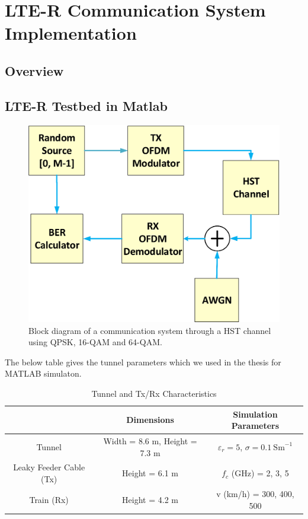\chapter{LTE-R Communication System Implementation}
\label{chapter5}

\section{Overview}

\section{LTE-R Testbed in Matlab}

\begin{figure}[!ht]
\label{finalblock}
\centering
\includegraphics[width=\linewidth,keepaspectratio]{images/Gill/lte_figs/finalblock.eps} 
\caption{Block diagram of a communication system through a HST channel using QPSK, 16-QAM and 64-QAM.}
\end{figure}
The below table gives the tunnel parameters which we used in the thesis for MATLAB simulaton.

\begin{table}[t!]
\centering
\caption{Tunnel and Tx/Rx Characteristics}
\begin{tabular}{c  c  c }
   & Dimensions & Simulation Parameters\\\hline
Tunnel & Width = 8.6 m, Height = 7.3 m & $\varepsilon_r = 5$, $\sigma = 0.1~\textrm{Sm}^{-1}$\\\hline
Leaky Feeder Cable (Tx) & Height = 6.1 m & $f_c$ (GHz) = 2, 3, 5\\\hline
Train (Rx) & Height = 4.2 m &  v (km/h) = 300, 400, 500\\
\hline
\end{tabular}
\label{tablelter}
\end{table}


